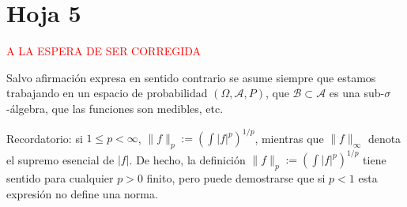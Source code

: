 
\newpage
\section{Hoja 5}

\textcolor{red}{A LA ESPERA DE SER CORREGIDA}

Salvo afirmaci\'on expresa en sentido
contrario se asume siempre que estamos trabajando en un espacio de probabilidad $(\Omega, \mathcal{A}, P)$,
que  $\mathcal{B}\subset \mathcal{A}$ es una sub-$\sigma$-\'algebra, que las funciones son medibles, etc.


Recordatorio: si $1\le p < \infty$, $\|f\|_p := \left(\int|f|^p\right)^{1/p}$, mientras que
$\|f\|_\infty$ denota el supremo esencial de $|f|$. De hecho, la definici\'on
 $\|f\|_p := \left(\int|f|^p\right)^{1/p}$ tiene sentido para cualquier $p > 0$ finito, pero puede
demostrarse que si $p < 1$ esta expresi\'on no define una norma.

